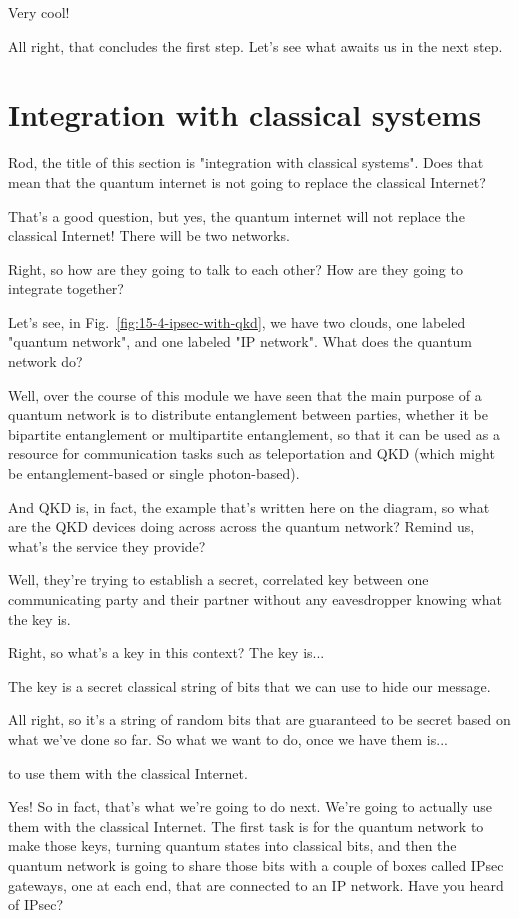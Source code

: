 \mmm Very cool!

All right, that concludes the first step. Let's see what awaits us in the next step.

\section{Integration with classical systems}
\label{sec:classical-integration}

\mmm Rod, the title of this section is "integration with classical systems". Does that mean that the quantum internet is not going to replace the classical Internet?

\rrr That's a good question, but yes, the quantum internet will not replace the classical Internet! There will be two networks.

\mmm Right, so how are they going to talk to each other? How are they going to integrate together?

\rrr Let's see, in Fig.~\ref{fig:15-4-ipsec-with-qkd}, we have two clouds, one labeled "quantum network", and one labeled "IP network". What does the quantum network do?

\mmm Well, over the course of this module we have seen that the main purpose of a quantum network is to distribute entanglement between parties, whether it be bipartite entanglement or multipartite entanglement, so that it can be used as a resource for communication tasks such as teleportation and QKD (which might be entanglement-based or single photon-based).

\rrr And QKD is, in fact, the example that's written here on the diagram, so what are the QKD devices doing across across the quantum network? Remind us, what's the service they provide?

\mmm Well, they're trying to establish a secret, correlated key between one communicating party and their partner without any eavesdropper knowing what the key is.

\rrr Right, so what's a key in this context? The key is...

\mmm The key is a secret classical string of bits that we can use to hide our message.

\rrr All right, so it's a string of random bits that are guaranteed to be secret based on what we've done so far. So what we want to do, once we have them is...

\mmm to use them with the classical Internet.

\rrr Yes! So in fact, that's what we're going to do next. We're going to actually use them with the classical Internet. The first task is for the quantum network to make those keys, turning quantum states into classical bits, and then the quantum network is going to share those bits with a couple of boxes called IPsec gateways, one at each end, that are connected to an IP network. Have you heard of IPsec?

